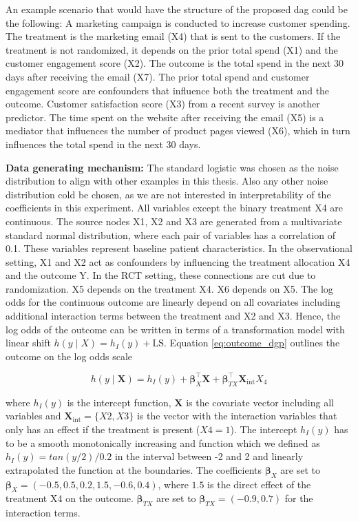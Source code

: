 An example scenario that would have the structure of the proposed dag could be the following: A marketing campaign is conducted to increase customer spending. The treatment is the marketing email (X4) that is sent to the customers. If the treatment is not randomized, it depends on the prior total spend (X1) and the customer engagement score (X2). The outcome is the total spend in the next 30 days after receiving the email (X7). The prior total spend and customer engagement score are confounders that influence both the treatment and the outcome. Customer satisfaction score (X3) from a recent survey is another predictor. The time spent on the website after receiving the email (X5) is a mediator that influences the number of product pages viewed (X6), which in turn influences the total spend in the next 30 days. 


\textbf{Data generating mechanism:} The standard logistic was chosen as the noise distribution to align with other examples in this thesis. Also any other noise distribution cold be chosen, as we are not interested in interpretability of the coefficients in this experiment. All variables except the binary treatment X4 are continuous. The source nodes X1, X2 and X3 are generated from a multivariate standard normal distribution, where each pair of variables has a correlation of 0.1. These variables represent baseline patient characteristics. In the observational setting, X1 and X2 act as confounders by influencing the treatment allocation X4 and the outcome Y. In the RCT setting, these connections are cut due to randomization. X5 depends on the treatment X4. X6 depends on X5. The log odds for the continuous outcome are linearly depend on all covariates including additional interaction terms between the treatment and X2 and X3. Hence, the log odds of the outcome can be written in terms of a transformation model with linear shift $h(y \mid X) = h_I(y) + \text{LS}$. Equation \ref{eq:outcome_dgp} outlines the outcome on the log odds scale



\begin{equation}
h(y \mid \mathbf{X}) = h_I(y) + \boldsymbol{\beta}_X^\top \mathbf{X} + \boldsymbol{\beta}_{TX}^\top \mathbf{X}_{\text{int}}  X_4
\label{eq:outcome_dgp}
\end{equation}

where $h_I(y)$ is the intercept function, $\mathbf{X}$ is the covariate vector including all variables and $\mathbf{X}_{\text{int}} = \{X2, X3\}$ is the vector with the interaction variables that only has an effect if the treatment is present ($X4 = 1$). The intercept $h_I(y)$ has to be a smooth monotonically increasing and function which we defined as $h_I(y) = tan(y/2) / 0.2$ in the interval between -2 and 2 and linearly extrapolated the function at the boundaries. The coefficients $\boldsymbol{\beta}_X$ are set to $\boldsymbol{\beta}_X = (-0.5, 0.5, 0.2, 1.5, -0.6, 0.4)$, where $1.5$ is the direct effect of the treatment X4 on the outcome. $\boldsymbol{\beta}_{TX}$ are set to $\boldsymbol{\beta}_{TX} = (-0.9, 0.7)$ for the interaction terms.


